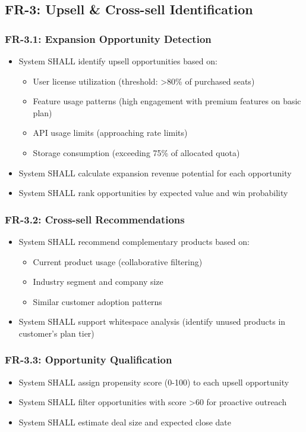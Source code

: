 \documentclass[12pt,a4paper]{article}
\begin{document}
\subsection{FR-3: Upsell \& Cross-sell Identification}
\subsubsection{FR-3.1: Expansion Opportunity Detection}
\begin{itemize}
    \item System SHALL identify upsell opportunities based on:
    \begin{itemize}
        \item User license utilization (threshold: >80\% of purchased seats)
        \item Feature usage patterns (high engagement with premium features on basic plan)
        \item API usage limits (approaching rate limits)
        \item Storage consumption (exceeding 75\% of allocated quota)
    \end{itemize}
    \item System SHALL calculate expansion revenue potential for each opportunity
    \item System SHALL rank opportunities by expected value and win probability
\end{itemize}
\subsubsection{FR-3.2: Cross-sell Recommendations}
\begin{itemize}
    \item System SHALL recommend complementary products based on:
    \begin{itemize}
        \item Current product usage (collaborative filtering)
        \item Industry segment and company size
        \item Similar customer adoption patterns
    \end{itemize}
    \item System SHALL support whitespace analysis (identify unused products in customer’s plan tier)
\end{itemize}
\subsubsection{FR-3.3: Opportunity Qualification}
\begin{itemize}
    \item System SHALL assign propensity score (0-100) to each upsell opportunity
    \item System SHALL filter opportunities with score >60 for proactive outreach
    \item System SHALL estimate deal size and expected close date
\end{itemize}
\end{document}
